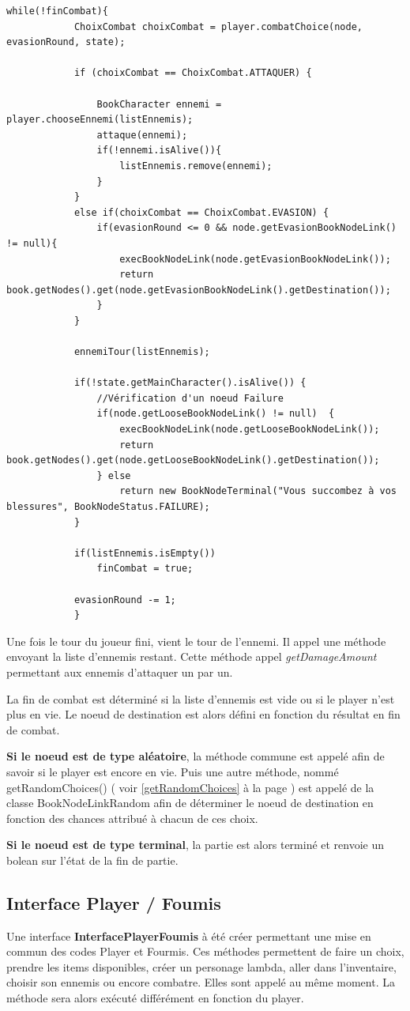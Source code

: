 		\begin{lstlisting}[caption=JeuCombat]
		while(!finCombat){
			ChoixCombat choixCombat = player.combatChoice(node, evasionRound, state);

			if (choixCombat == ChoixCombat.ATTAQUER) {

				BookCharacter ennemi = player.chooseEnnemi(listEnnemis);
				attaque(ennemi);
				if(!ennemi.isAlive()){
					listEnnemis.remove(ennemi);
				}
			}
			else if(choixCombat == ChoixCombat.EVASION) {
				if(evasionRound <= 0 && node.getEvasionBookNodeLink() != null){
					execBookNodeLink(node.getEvasionBookNodeLink());
					return book.getNodes().get(node.getEvasionBookNodeLink().getDestination());
				}
			}

			ennemiTour(listEnnemis);

			if(!state.getMainCharacter().isAlive()) {
				//Vérification d'un noeud Failure
				if(node.getLooseBookNodeLink() != null)  {
					execBookNodeLink(node.getLooseBookNodeLink());
					return book.getNodes().get(node.getLooseBookNodeLink().getDestination());
				} else
					return new BookNodeTerminal("Vous succombez à vos blessures", BookNodeStatus.FAILURE);
			}

			if(listEnnemis.isEmpty())
				finCombat = true;

			evasionRound -= 1;
			}
		\end{lstlisting}

		Une fois le tour du joueur fini, vient le tour de l'ennemi. Il appel une méthode envoyant la liste d'ennemis restant. Cette méthode appel \textit{getDamageAmount} permettant aux ennemis d'attaquer un par un.

		La fin de combat est déterminé si la liste d'ennemis est vide ou si le player n'est plus en vie. Le noeud de destination est alors défini en fonction du résultat en fin de combat.

		\textbf{Si le noeud est de type aléatoire}, la méthode commune est appelé afin de savoir si le player est encore en vie. Puis une autre méthode, nommé getRandomChoices() ( voir \ref{getRandomChoices} à la page \pageref{getRandomChoices}) est appelé de la classe BookNodeLinkRandom afin de déterminer le noeud de destination en fonction des chances attribué à chacun de ces choix.

		\textbf{Si le noeud est de type terminal}, la partie est alors terminé et renvoie un bolean sur l'état de la fin de partie.

	\subsection{Interface Player / Foumis}
		Une interface \textbf{InterfacePlayerFoumis} à été créer permettant une mise en commun des codes Player et Fourmis. Ces méthodes permettent de faire un choix, prendre les items disponibles, créer un personage lambda, aller dans l'inventaire, choisir son ennemis ou encore combatre. Elles sont appelé au même moment. La méthode sera alors exécuté différément en fonction du player.

